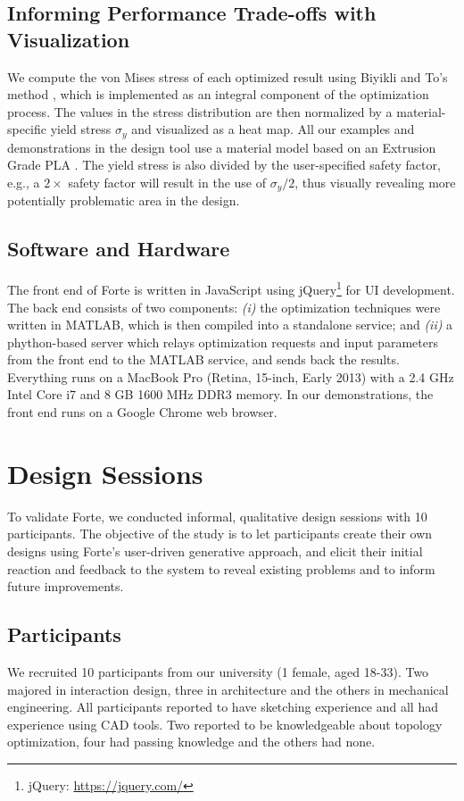 \subsection{Informing Performance Trade-offs with Visualization}
We compute the von Mises stress of each optimized result using Biyikli and To's method \cite{biyikli2015proportional}, which is implemented as an integral component of the optimization process. The values in the stress distribution are then normalized by a material-specific yield stress $\sigma_y$ and visualized as a heat map. All our examples and demonstrations in the design tool use a material model based on an Extrusion Grade PLA \cite{NatureWo45:online}. The yield stress is also divided by the user-specified safety factor, e.g., a $2\times$ safety factor will result in the use of $\sigma_y/2$, thus visually revealing more potentially problematic area in the design.

\subsection{Software and Hardware}
The front end of Forte is written in JavaScript using jQuery\footnote{jQuery: \url{https://jquery.com/}} for UI development. The back end consists of two components: {\em(i)} the optimization techniques were written in MATLAB, which is then compiled into a standalone service; and {\em(ii)} a phython-based server which relays optimization requests and input parameters from the front end to the MATLAB service, and sends back the results. Everything runs on a MacBook Pro (Retina, 15-inch, Early 2013) with a 2.4 GHz Intel Core i7 and 8 GB 1600 MHz DDR3 memory. In our demonstrations, the front end runs on a Google Chrome web browser.

\section{Design Sessions}
To validate Forte, we conducted informal, qualitative design sessions with 10 participants. The objective of the study is to let participants create their own designs using Forte's user-driven generative approach, and elicit their initial reaction and feedback to the system to reveal existing problems and to inform future improvements.

\subsection{Participants}
We recruited 10 participants from our university (1 female, aged 18-33). Two majored in interaction design, three in architecture and the others in mechanical engineering. All participants reported to have sketching experience and all had experience using CAD tools. Two reported to be knowledgeable about topology optimization, four had passing knowledge and the others had none.

